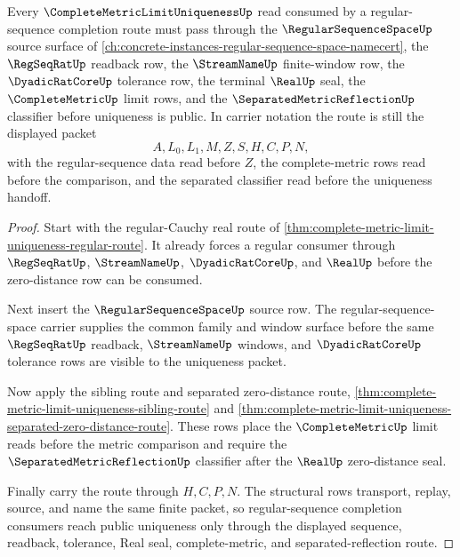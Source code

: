 \begin{theorem}
\label{thm:complete-metric-limit-uniqueness-regular-sequence-forward-route}
Every $\CompleteMetricLimitUniquenessUp$ read consumed by a regular-sequence completion route must pass through the $\RegularSequenceSpaceUp$ source surface of \autoref{ch:concrete-instances-regular-sequence-space-namecert}, the $\RegSeqRatUp$ readback row, the $\StreamNameUp$ finite-window row, the $\DyadicRatCoreUp$ tolerance row, the terminal $\RealUp$ seal, the $\CompleteMetricUp$ limit rows, and the $\SeparatedMetricReflectionUp$ classifier before uniqueness is public. In carrier notation the route is still the displayed packet
$$
A,L_{0},L_{1},M,Z,S,H,C,P,N,
$$
with the regular-sequence data read before $Z$, the complete-metric rows read before the comparison, and the separated classifier read before the uniqueness handoff.
\end{theorem}
\begin{proof}
Start with the regular-Cauchy real route of \autoref{thm:complete-metric-limit-uniqueness-regular-route}. It already forces a regular consumer through $\RegSeqRatUp$, $\StreamNameUp$, $\DyadicRatCoreUp$, and $\RealUp$ before the zero-distance row can be consumed.

Next insert the $\RegularSequenceSpaceUp$ source row. The regular-sequence-space carrier supplies the common family and window surface before the same $\RegSeqRatUp$ readback, $\StreamNameUp$ windows, and $\DyadicRatCoreUp$ tolerance rows are visible to the uniqueness packet.

Now apply the sibling route and separated zero-distance route, \autoref{thm:complete-metric-limit-uniqueness-sibling-route} and \autoref{thm:complete-metric-limit-uniqueness-separated-zero-distance-route}. These rows place the $\CompleteMetricUp$ limit reads before the metric comparison and require the $\SeparatedMetricReflectionUp$ classifier after the $\RealUp$ zero-distance seal.

Finally carry the route through $H,C,P,N$. The structural rows transport, replay, source, and name the same finite packet, so regular-sequence completion consumers reach public uniqueness only through the displayed sequence, readback, tolerance, Real seal, complete-metric, and separated-reflection route.
\end{proof}
